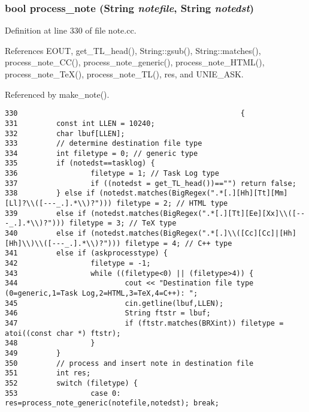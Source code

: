 \subsubsection{\setlength{\rightskip}{0pt plus 5cm}bool process\_\-note ({\bf String} {\em notefile}, {\bf String} {\em notedst})}\label{note_8cc_a8}




Definition at line 330 of file note.cc.

References EOUT, get\_\-TL\_\-head(), String::gsub(), String::matches(), process\_\-note\_\-CC(), process\_\-note\_\-generic(), process\_\-note\_\-HTML(), process\_\-note\_\-Te\-X(), process\_\-note\_\-TL(), res, and UNIE\_\-ASK.

Referenced by make\_\-note().



\footnotesize\begin{verbatim}330                                                    {
331         const int LLEN = 10240;
332         char lbuf[LLEN];
333         // determine destination file type
334         int filetype = 0; // generic type
335         if (notedst==tasklog) {
336                 filetype = 1; // Task Log type
337                 if ((notedst = get_TL_head())=="") return false;
338         } else if (notedst.matches(BigRegex(".*[.][Hh][Tt][Mm][Ll]?\\([---_.].*\\)?"))) filetype = 2; // HTML type
339         else if (notedst.matches(BigRegex(".*[.][Tt][Ee][Xx]\\([---_.].*\\)?"))) filetype = 3; // TeX type
340         else if (notedst.matches(BigRegex(".*[.]\\([Cc][Cc]|[Hh][Hh]\\)\\([---_.].*\\)?"))) filetype = 4; // C++ type
341         else if (askprocesstype) {
342                 filetype = -1;
343                 while ((filetype<0) || (filetype>4)) {
344                         cout << "Destination file type (0=generic,1=Task Log,2=HTML,3=TeX,4=C++): ";
345                         cin.getline(lbuf,LLEN);
346                         String ftstr = lbuf;
347                         if (ftstr.matches(BRXint)) filetype = atoi((const char *) ftstr);
348                 }
349         }
350         // process and insert note in destination file
351         int res;
352         switch (filetype) {
353                 case 0: res=process_note_generic(notefile,notedst); break;

\end{verbatim}
